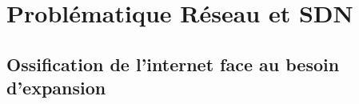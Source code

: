 \chapter{Problématique Réseau et SDN}
\label{chap-1}





\section{Ossification de l'internet face au besoin d'expansion}







